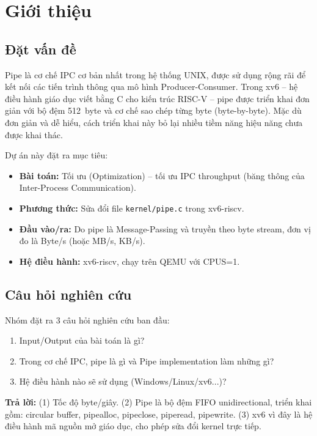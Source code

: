 \documentclass[12pt,a4paper]{article}
\newcommand{\code}[1]{\texttt{#1}}
\newcommand{\tightlist}{\setlength{\itemsep}{2pt}\setlength{\parskip}{0pt}}
\begin{document}
\section{Giới thiệu}

\subsection{Đặt vấn đề}

Pipe là cơ chế IPC cơ bản nhất trong hệ thống UNIX, được sử dụng rộng rãi để kết nối
các tiến trình thông qua mô hình Producer-Consumer. Trong xv6 -- hệ điều hành giáo dục
viết bằng C cho kiến trúc RISC-V -- pipe được triển khai đơn giản với bộ đệm 512~byte
và cơ chế sao chép từng byte (byte-by-byte). Mặc dù đơn giản và dễ hiểu, cách triển
khai này bỏ lại nhiều tiềm năng hiệu năng chưa được khai thác.

Dự án này đặt ra mục tiêu:
\begin{itemize}\tightlist
    \item \textbf{Bài toán:} Tối ưu (Optimization) -- tối ưu IPC throughput (băng thông
    của Inter-Process Communication).
    \item \textbf{Phương thức:} Sửa đổi file \code{kernel/pipe.c} trong xv6-riscv.
    \item \textbf{Đầu vào/ra:} Do pipe là Message-Passing và truyền theo byte stream,
    đơn vị đo là Byte/s (hoặc MB/s, KB/s).
    \item \textbf{Hệ điều hành:} xv6-riscv, chạy trên QEMU với CPUS=1.
\end{itemize}

\subsection{Câu hỏi nghiên cứu}

Nhóm đặt ra 3 câu hỏi nghiên cứu ban đầu:
\begin{enumerate}\tightlist
    \item Input/Output của bài toán là gì?
    \item Trong cơ chế IPC, pipe là gì và Pipe implementation làm những gì?
    \item Hệ điều hành nào sẽ sử dụng (Windows/Linux/xv6...)?
\end{enumerate}

\textbf{Trả lời:} (1) Tốc độ byte/giây. (2) Pipe là bộ đệm FIFO unidirectional, triển
khai gồm: circular buffer, pipealloc, pipeclose, piperead, pipewrite. (3) xv6 vì đây là
hệ điều hành mã nguồn mở giáo dục, cho phép sửa đổi kernel trực tiếp.
\end{document}
